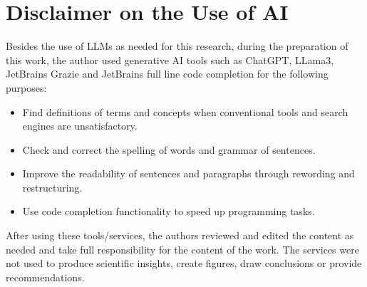 \section*{Disclaimer on the Use of AI}
\label{sec:disclaimer-use-ai}

Besides the use of LLMs as needed for this research, during the preparation of this work, the author used generative AI
tools such as ChatGPT, LLama3, JetBrains Grazie and JetBrains full line code completion for the
following purposes:

\begin{itemize}
    \item Find definitions of terms and concepts when conventional tools and search engines are unsatisfactory.
    \item Check and correct the spelling of words and grammar of sentences.
    \item Improve the readability of sentences and paragraphs through rewording and restructuring.
    \item Use code completion functionality to speed up programming tasks.
\end{itemize}

After using these tools/services, the authors reviewed and edited the content as needed and take full responsibility for
the content of the work.
The services were not used to produce scientific insights, create figures, draw conclusions or provide recommendations.